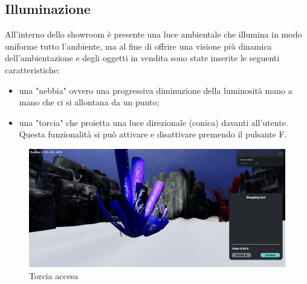 \subsection{Illuminazione}
All'interno dello showroom è presente una luce ambientale che illumina in modo uniforme tutto l'ambiente, ma al fine di offrire una visione più dinamica dell'ambientazione e degli oggetti in vendita sono state inserite le seguenti caratteristiche:
\begin{itemize}
	\item una "nebbia" ovvero una progressiva diminuzione della luminosità mano a mano che ci si allontana da un punto;
	\item una "torcia" che proietta una luce direzionale (conica) davanti all'utente. Questa funzionalità si può attivare e disattivare premendo il pulsante F.
\end{itemize}

\begin{figure}[H]
  \renewcommand{\thefigure}{8}
  \includegraphics[width=\linewidth]{./res/images/torcia.png}
  \caption{Torcia accesa}
  \label{Torcia acccesa}
\end{figure}



